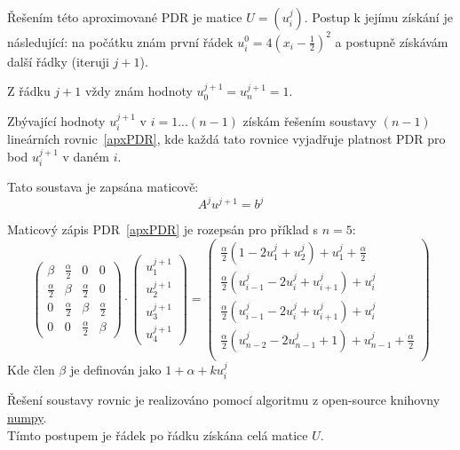 \documentclass[a4paper,12pt]{article}
\begin{document}
Řešením této aproximované PDR je matice $U = \left( u_i^j \right)$.
Postup k jejímu získání je následující: na počátku znám první řádek $u_i^0 = 4(x_i - \tfrac{1}{2})^2$ a postupně získávám další řádky (iteruji $j+1$).

Z řádku $j+1$ vždy znám hodnoty $u_0^{j+1} = u_n^{j+1} = 1$.

Zbývající hodnoty $u_i^{j+1}$ v $i=1...(n-1)$ získám řešením soustavy $(n-1)$ lineárních rovnic~\ref{apxPDR}, kde každá tato rovnice vyjadřuje platnost PDR pro bod $u_i^{j+1}$ v daném $i$.

Tato soustava je zapsána maticově:
\begin{equation}
	A^j u^{j+1} = b^j
\end{equation}

Maticový zápis PDR~\ref{apxPDR} je rozepsán pro příklad s $n=5$:
\begin{equation}
\begin{pmatrix}
	\beta & \tfrac{\alpha}{2} & 0 & 0 \\
	\tfrac{\alpha}{2} & \beta & \tfrac{\alpha}{2} & 0 \\
	0 & \tfrac{\alpha}{2} & \beta & \tfrac{\alpha}{2} \\
	0 & 0 & \tfrac{\alpha}{2} & \beta
\end{pmatrix}
\cdot
\begin{pmatrix}
	u_1^{j+1} \\ u_2^{j+1} \\ u_3^{j+1} \\ u_4^{j+1}
\end{pmatrix}
=
\begin{pmatrix}
	\tfrac{\alpha}{2} \left( 1 - 2 u_1^j + u_2^j \right) + u_1^j + \tfrac{\alpha}{2} \\
	\tfrac{\alpha}{2} \left( u_{i-1}^j - 2 u_i^j + u_{i+1}^j \right) + u_i^j \\
	\tfrac{\alpha}{2} \left( u_{i-1}^j - 2 u_i^j + u_{i+1}^j \right) + u_i^j \\
	\tfrac{\alpha}{2} \left( u_{n-2}^j - 2 u_{n-1}^j + 1 \right) + u_{n-1}^j + \tfrac{\alpha}{2} \\
\end{pmatrix}
\end{equation}
Kde člen $\beta$ je definován jako $1 + \alpha + k u_i^j$

Řešení soustavy rovnic je realizováno pomocí algoritmu z open-source knihovny \textcolor{blue}{\underline{\href{https://numpy.org/}{numpy}}}.\\
Tímto postupem je řádek po řádku získána celá matice $U$.
\end{document}
